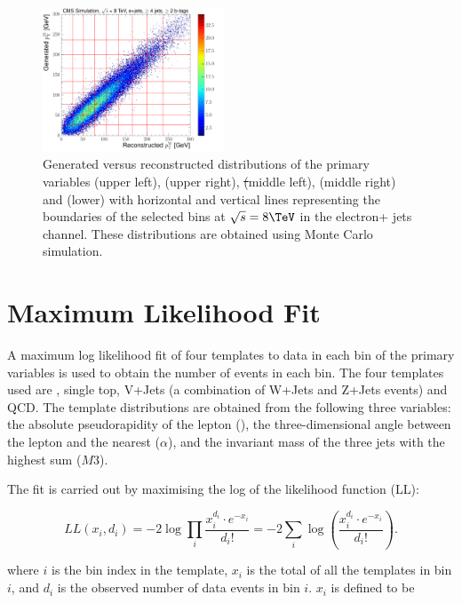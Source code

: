 \begin{figure}[hbtp]
	 \includegraphics[width=0.48\textwidth]{Chapters/04_Analysis/04b_XSections/images/binning/electron_WPT_8TeV.pdf}\hfill
	 \caption{Generated versus reconstructed distributions of the primary variables \met (upper left), \HT (upper
	 right), \st (middle left), \mt (middle right) and \wpt (lower) with horizontal and vertical lines
	 representing the boundaries of the selected bins at $\sqrt{s}=8\TeV$ in the electron+ jets channel. These
	 distributions are obtained using \ttbar Monte Carlo simulation.}
     \label{fig:binning_8TeV_electron}
 \end{figure}
\FloatBarrier

\section{Maximum Likelihood Fit}
\label{s:maximum_likelihood_fit}
A maximum log likelihood fit of four templates to data in each bin of the primary variables is used to obtain
the number of events in each bin. The four templates used are \ttbar, single top, V+Jets (a combination of
W+Jets and Z+Jets events) and QCD. The template distributions are obtained from the following three
variables: the absolute pseudorapidity of the lepton (\abseta), the three-dimensional angle between the lepton
and the nearest \bjet ($\alpha$), and the invariant mass of the three jets with the highest \pt sum ($M3$).

The fit is carried out by maximising the log of the likelihood function (LL):

\begin{equation}
\label{log_likelihood}
LL\left(x_i, d_i\right) = -2 \log{\prod\limits_{i}\frac{x_i^{d_i}\cdot
e^{-x_i}}{d_i!}}=-2\sum\limits_{i}\log{\left(\frac{x_i^{d_i}\cdot e^{-x_i}}{d_i!}\right)}.
\end{equation}

where $i$ is the bin index in the template, $x_i$ is the total of all the templates in bin $i$, and $d_i$ is
the observed number of data events in  bin $i$. $x_i$ is defined to be

